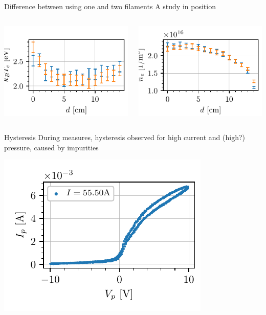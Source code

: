 \documentclass[10pt]{beamer}
\begin{document}
\begin{frame}{Difference between using one and two filaments}
    {A study in position}
    \begin{columns}
        \centering
        \includegraphics[scale=1]{../figures/temperatureeV_position_twofilaments.pdf}

        \centering
        \includegraphics[scale=1]{../figures/density_position_twofilaments.pdf}

    \end{columns}
\end{frame}

\begin{frame}{Hysteresis}
    During measures,
    hysteresis observed for high current and (high?) pressure, caused by impurities

    \includegraphics[scale=1]{../figures/hysteresis.pdf}

\end{frame}
\end{document}
